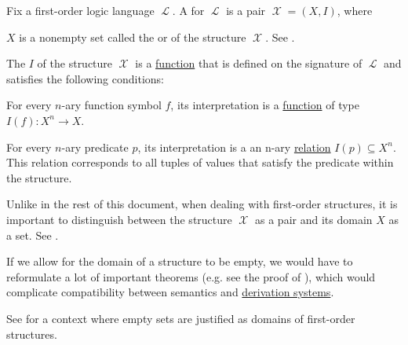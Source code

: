 \begin{definition}\label{def:first_order_structure}
  Fix a first-order logic language \( \mscrL \). A  for \( \mscrL \) is a pair \( \mscrX = (X, I) \), where
  \begin{thmenum}
     \( X \) is a nonempty set called the  or  of the structure \( \mscrX \). See .

     The  \( I \) of the structure \( \mscrX \) is a \hyperref[def:function/single_valued]{function} that is defined on the signature of \( \mscrL \) and satisfies the following conditions:
    \begin{thmenum}
       For every \( n \)-ary function symbol \( f \), its interpretation is a \hyperref[def:function]{function} of type \( I(f): X^n \to X \).

       For every \( n \)-ary predicate \( p \), its interpretation is a an n-ary \hyperref[def:relation]{relation} \( I(p) \subseteq X^n \). This relation corresponds to all tuples of values that satisfy the predicate within the structure.
    \end{thmenum}
  \end{thmenum}

  Unlike in the rest of this document, when dealing with first-order structures, it is important to distinguish between the structure \( \mscrX \) as a pair and its domain \( X \) as a set. See .
\end{definition}

\begin{remark}\label{rem:empty_models}
   If we allow for the domain of a structure to be empty, we would have to reformulate a lot of important theorems (e.g. see the proof of ), which would complicate compatibility between semantics and \hyperref[def:proof_derivation_system]{derivation systems}.

   See  for a context where empty sets are justified as domains of first-order structures.
\end{remark}

